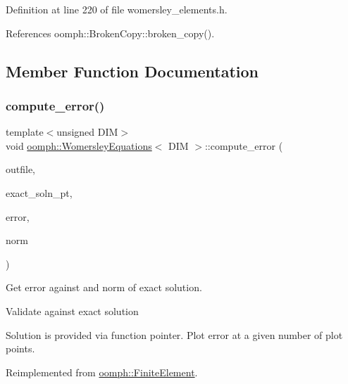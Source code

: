 Definition at line 220 of file womersley\+\_\+elements.\+h.



References oomph\+::\+Broken\+Copy\+::broken\+\_\+copy().



\subsection{Member Function Documentation}
\mbox{\label{classoomph_1_1WomersleyEquations_a29f1f7483545f64e8e04b24dcdce29ef}} 
\subsubsection{\texorpdfstring{compute\+\_\+error()}{compute\_error()}\hspace{0.1cm}{\footnotesize\ttfamily [1/2]}}
{\footnotesize\ttfamily template$<$unsigned D\+IM$>$ \\
void \hyperlink{classoomph_1_1WomersleyEquations}{oomph\+::\+Womersley\+Equations}$<$ D\+IM $>$\+::compute\+\_\+error (\begin{DoxyParamCaption}\item[{std\+::ostream \&}]{outfile,  }\item[{\hyperlink{classoomph_1_1FiniteElement_a690fd33af26cc3e84f39bba6d5a85202}{Finite\+Element\+::\+Steady\+Exact\+Solution\+Fct\+Pt}}]{exact\+\_\+soln\+\_\+pt,  }\item[{double \&}]{error,  }\item[{double \&}]{norm }\end{DoxyParamCaption})\hspace{0.3cm}{\ttfamily [virtual]}}



Get error against and norm of exact solution. 

Validate against exact solution

Solution is provided via function pointer. Plot error at a given number of plot points. 

Reimplemented from \hyperlink{classoomph_1_1FiniteElement_a73c79a1f1e5b1d334757812a6bbd58ff}{oomph\+::\+Finite\+Element}.



